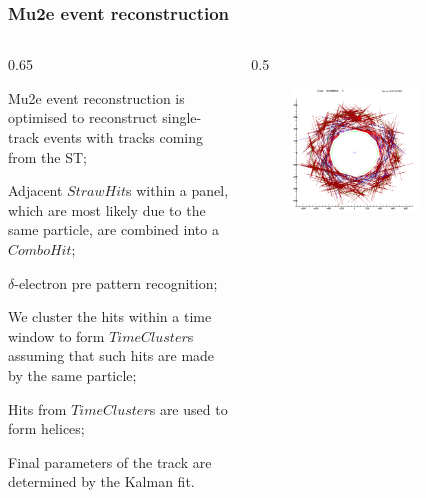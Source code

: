 \documentclass{beamer}
\begin{document}
\begin{frame}
    \frametitle{Mu2e event reconstruction}
    \vspace{-3mm}
\begin{columns}
\begin{column}{0.65\framewidth}
 \setlength{\leftmargini}{1.2em}
 \vspace{-3mm}
\begin{itemize}
{\small\item Mu2e event reconstruction is optimised to
reconstruct single-track events with tracks coming
from the ST;
 \vspace{1.2mm}
\item  Adjacent $StrawHit$s within a panel, which are most likely due to the same particle, are combined 
into a $ComboHit$;
\vspace{1.2mm}
\item $\delta$-electron pre pattern recognition;
\vspace{1.2mm}
\item We cluster the hits within a time window to form
$TimeCluster$s assuming that such hits are made
by the same particle;
\vspace{1.2mm}
\item Hits from $TimeCluster$s are used to form helices;
\vspace{1.2mm}
\item Final parameters of the track are determined by
the Kalman fit.}
\end{itemize}
\end{column}    
\begin{column}{0.5\framewidth}
    \begin{figure}[!h]
        \centering
        \includegraphics[width =0.7\textwidth]{figures/png/Screenshot_20240811_123612.png}
       

\end{figure}
\end{column}
\end{columns}
\end{frame}
\end{document}
